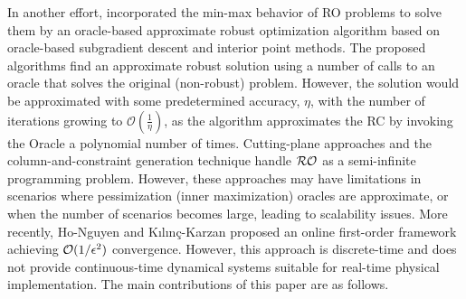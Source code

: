 \documentclass[journal,twoside,web]{ieeecolor}
\newcommand{\rev}[1]{\textcolor{revisionblue}{#1}}
\begin{document}
In another effort, \cite{bental2015} incorporated the min-max behavior of RO problems to solve them by an oracle-based approximate robust optimization algorithm based on oracle-based subgradient descent and interior point methods. The proposed algorithms find an approximate robust solution using a number of calls to an oracle that solves the original (non-robust) problem. However, the solution would be approximated with some predetermined accuracy, $\eta$, with the number of iterations growing to $\mathcal{O}(\frac{1}{\eta})$, as the algorithm approximates the RC by invoking the Oracle a polynomial number of times. Cutting-plane approaches \cite{mutapcic2009} and the column-and-constraint generation technique \cite{zeng2013} handle ${\cal RO}$ as a semi-infinite programming problem. However, these approaches may have limitations in scenarios where pessimization (inner maximization) oracles are approximate, or when the number of scenarios becomes large, leading to scalability issues. \rev{More recently, Ho-Nguyen and K{\i}l{\i}n\c{c}-Karzan \cite{honguyen2018} proposed an online first-order framework achieving ${\cal O}(1/\epsilon^2)$ convergence. However, this approach is discrete-time and does not provide continuous-time dynamical systems suitable for real-time physical implementation.} The main contributions of this paper are as follows.

\end{document}
